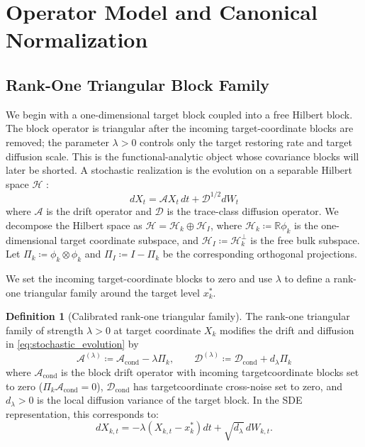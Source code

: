 \documentclass[preprint,12pt]{elsarticle}
\theoremstyle{plain}
\theoremstyle{definition}
\newtheorem{definition}[theorem]{Definition}
\theoremstyle{remark}
\newcommand{\cond}{\operatorname{cond}}
\begin{document}
    \section{Operator Model and Canonical Normalization}
    \label{sec:setup}

    \subsection{Rank-One Triangular Block Family}
    \label{sec:setup:evolution}

    We begin with a one-dimensional target block coupled into a free Hilbert
    block.  The block operator is triangular after the incoming target-coordinate
    blocks are removed; the parameter $\lambda>0$ controls only the target
    restoring rate and target diffusion scale.  This is the functional-analytic
    object whose covariance blocks will later be shorted.  A stochastic
    realization is the evolution on a separable Hilbert space $\mathcal{H}$
    \cite{daprato2014stochastic}:
    \begin{equation}
        \label{eq:stochastic_evolution}
        dX_t = \mathcal{A} X_t \, dt + \mathcal{D}^{1/2} dW_t
    \end{equation}
    where $\mathcal{A}$ is the drift operator and $\mathcal{D}$ is the trace-class diffusion operator. We decompose the Hilbert space as $\mathcal{H} = \mathcal{H}_k \oplus \mathcal{H}_I$, where $\mathcal{H}_k \coloneqq \mathbb{R}\phi_k$ is the one-dimensional target coordinate subspace, and $\mathcal{H}_I \coloneqq \mathcal{H}_k^\perp$ is the free bulk subspace. Let $\Pi_k \coloneqq \phi_k \otimes \phi_k$ and $\Pi_I \coloneqq I - \Pi_k$ be the corresponding orthogonal projections.

    We set the incoming target-coordinate blocks to zero and use $\lambda$ to
    define a rank-one triangular family around the target level $x_k^*$.

    \begin{definition}[Calibrated rank-one triangular family]
        \label{def:soft_do}
        The rank-one triangular family of strength $\lambda > 0$ at target
        coordinate $X_k$ modifies the drift and diffusion in
        \eqref{eq:stochastic_evolution} by
        \begin{equation}
            \label{eq:soft_do_sde}
            \mathcal{A}^{(\lambda)} \coloneqq \mathcal{A}_{\cond} - \lambda \Pi_k, \qquad
            \mathcal{D}^{(\lambda)} \coloneqq \mathcal{D}_{\cond} + d_\lambda \Pi_k
        \end{equation}
        where $\mathcal{A}_{\cond}$ is the block drift operator with incoming target\-co\-or\-di\-nate blocks set to zero ($\Pi_k \mathcal{A}_{\cond} = 0$), $\mathcal{D}_{\cond}$ has target\-co\-or\-di\-nate cross-noise set to zero, and $d_\lambda > 0$ is the local diffusion variance of the target block. In the SDE representation, this corresponds to:
        \begin{equation}
            \label{eq:soft_do_sde_general}
            dX_{k,t} = -\lambda (X_{k,t} - x_k^*) dt + \sqrt{d_\lambda}\, dW_{k,t}.
        \end{equation}
    \end{definition}
\end{document}
